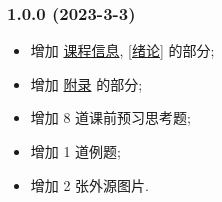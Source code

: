 \subsubsection*{1.0.0 (2023-3-3)}
\begin{itemize}
    \item 增加 \hyperref[课程信息]{课程信息}, \ref{绪论} 的部分;
    \item 增加 \hyperref[附录]{附录} 的部分;
    \item 增加 8 道课前预习思考题;
    \item 增加 1 道例题;
    \item 增加 2 张外源图片.
\end{itemize}
